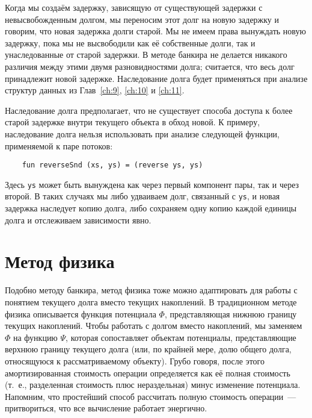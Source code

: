 Когда мы создаём задержку, зависящую от существующей задержки с
невысвобожденным долгом, мы переносим этот долг на новую задержку и
говорим, что новая задержка  долги
старой. Мы не имеем права вынуждать новую задержку, пока мы не
высвободили как её собственные долги, так и унаследованные от старой
задержки. В методе банкира не делается никакого различия между этими
двумя разновидностями долга; считается, что весь долг принадлежит
новой задержке. Наследование долга будет применяться при анализе
структур данных из Глав~\ref{ch:9}, \ref{ch:10} и \ref{ch:11}.

\begin{remark}
  Наследование долга предполагает, что не существует способа доступа к
  более старой задержке внутри текущего объекта в обход новой. К
  примеру, наследование долга нельзя использовать при анализе следующей
  функции, применяемой к паре потоков:
  \begin{lstlisting}
    fun reverseSnd (xs, ys) = (reverse ys, ys)
  \end{lstlisting}
  Здесь \lstinline!ys! может быть вынуждена как через первый компонент
  пары, так и через второй. В таких случаях мы либо удваиваем долг,
  связанный с \lstinline!ys!, и новая задержка наследует копию долга,
  либо сохраняем одну копию каждой единицы долга и отслеживаем
  зависимости явно.
\end{remark}

\section{Метод физика}
\label{sc:6.4}

Подобно методу банкира, метод физика тоже можно адаптировать для работы
с понятием текущего долга вместо текущих накоплений.  В традиционном
методе физика описывается функция потенциала $\Phi$, представляющая
нижнюю границу текущих накоплений. Чтобы работать с долгом вместо
накоплений, мы заменяем $\Phi$ на функцию $\Psi$, которая сопоставляет
объектам потенциалы, представляющие верхнюю границу текущего долга
(или, по крайней мере, долю общего долга, относящуюся к
рассматриваемому объекту).  Грубо говоря, после этого амортизированная
стоимость операции определяется как её полная стоимость (т.~е.,
разделенная стоимость плюс нераздельная) минус изменение
потенциала. Напомним, что простейший способ рассчитать полную
стоимость операции~--- притвориться, что все вычисление работает
энергично.


